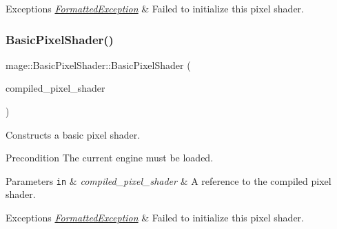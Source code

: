 \begin{DoxyExceptions}{Exceptions}
{\em \hyperlink{structmage_1_1_formatted_exception}{Formatted\+Exception}} & Failed to initialize this pixel shader. \\
\hline
\end{DoxyExceptions}
\hypertarget{classmage_1_1_basic_pixel_shader_a775a07e4b99ee726cff163fd00fb07f5}{}\label{classmage_1_1_basic_pixel_shader_a775a07e4b99ee726cff163fd00fb07f5} 
\subsubsection{\texorpdfstring{Basic\+Pixel\+Shader()}{BasicPixelShader()}\hspace{0.1cm}{\footnotesize\ttfamily [3/6]}}
{\footnotesize\ttfamily mage\+::\+Basic\+Pixel\+Shader\+::\+Basic\+Pixel\+Shader (\begin{DoxyParamCaption}\item[{const \hyperlink{structmage_1_1_compiled_pixel_shader}{Compiled\+Pixel\+Shader} \&}]{compiled\+\_\+pixel\+\_\+shader }\end{DoxyParamCaption})\hspace{0.3cm}{\ttfamily [explicit]}}

Constructs a basic pixel shader.

\begin{DoxyPrecond}{Precondition}
The current engine must be loaded. 
\end{DoxyPrecond}

\begin{DoxyParams}[1]{Parameters}
\mbox{\tt in}  & {\em compiled\+\_\+pixel\+\_\+shader} & A reference to the compiled pixel shader. \\
\hline
\end{DoxyParams}

\begin{DoxyExceptions}{Exceptions}
{\em \hyperlink{structmage_1_1_formatted_exception}{Formatted\+Exception}} & Failed to initialize this pixel shader. \\
\hline
\end{DoxyExceptions}
\hypertarget{classmage_1_1_basic_pixel_shader_a78887590e4ed3b769b68051ad9aa0db5}{}\label{classmage_1_1_basic_pixel_shader_a78887590e4ed3b769b68051ad9aa0db5} 
